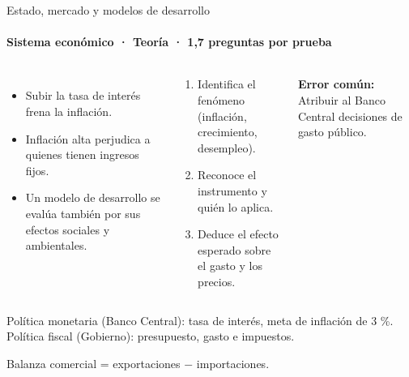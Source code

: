 \documentclass[aspectratio=169,11pt]{beamer}
\newlength{\ajustealto}
\newenvironment{ajustar}[1][0.74\textheight]
  {\setlength{\ajustealto}{#1}\begin{lrbox}{\ajustecaja}\begin{minipage}{\textwidth}}
  {\end{minipage}\end{lrbox}%
   \ifdim\dimexpr\ht\ajustecaja+\dp\ajustecaja\relax>\ajustealto
     \resizebox*{!}{\ajustealto}{\usebox{\ajustecaja}}\else\usebox{\ajustecaja}\fi}
\begin{document}
\begin{frame}{Estado, mercado y modelos de desarrollo}
\label{tema-hi-macro}
\framesubtitle{Sistema económico · Teoría · 1,7 preguntas por prueba}
\begin{ajustar}
\begin{columns}[T,onlytextwidth]
\begin{itemize}\footnotesize
\item Subir la tasa de interés frena la inflación.
\item Inflación alta perjudica a quienes tienen ingresos fijos.
\item Un modelo de desarrollo se evalúa también por sus efectos sociales y ambientales.
\end{itemize}
\begin{cajaregla}\scriptsize \begin{enumerate}\item Identifica el fenómeno (inflación, crecimiento, desempleo).\item Reconoce el instrumento y quién lo aplica.\item Deduce el efecto esperado sobre el gasto y los precios.\end{enumerate}\end{cajaregla}
\begin{notagris}\scriptsize \textbf{Error común:} Atribuir al Banco Central decisiones de gasto público.\end{notagris}
\end{columns}
\begin{cajaclave}[Instrumentos]\footnotesize
Política monetaria (Banco Central): tasa de interés, meta de inflación de 3 \%. Política fiscal (Gobierno): presupuesto, gasto e impuestos.

Balanza comercial = exportaciones $-$ importaciones.
\end{cajaclave}
\end{ajustar}
\end{frame}
\end{document}
